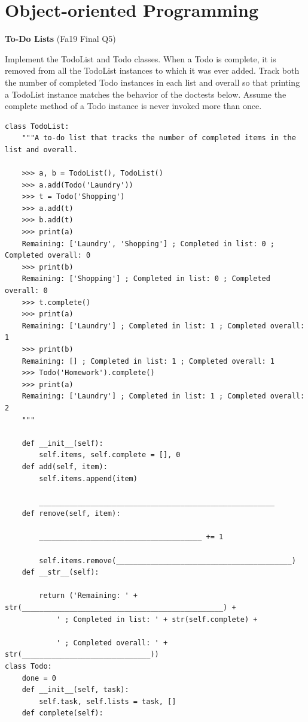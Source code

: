 \documentclass{exam}
\newlength{\currentparskip}
\newenvironment{blocksection}
{
    \setlength{\currentparskip}{\parskip}%
    \begin{minipage}{\linewidth}
    \setlength{\parskip}{\currentparskip}%
}
{
    \end{minipage}
}
\begin{document}
\newpage
\section{Object-oriented Programming}
\begin{questions}
\begin{blocksection}
\question \textbf{To-Do Lists} (Fa19 Final Q5)

    Implement the TodoList and Todo classes. When a Todo is complete, it is removed from all the TodoList instances to which it was ever added. Track both the number of completed Todo instances in each list and overall so that printing a TodoList instance matches the behavior of the doctests below. Assume the complete method of a Todo instance is never invoked more than once.
\end{blocksection}
\begin{blocksection}
\begin{lstlisting}
class TodoList:
    """A to-do list that tracks the number of completed items in the list and overall.

    >>> a, b = TodoList(), TodoList()
    >>> a.add(Todo('Laundry'))
    >>> t = Todo('Shopping')
    >>> a.add(t)
    >>> b.add(t)
    >>> print(a)
    Remaining: ['Laundry', 'Shopping'] ; Completed in list: 0 ; Completed overall: 0
    >>> print(b)
    Remaining: ['Shopping'] ; Completed in list: 0 ; Completed overall: 0
    >>> t.complete()
    >>> print(a)
    Remaining: ['Laundry'] ; Completed in list: 1 ; Completed overall: 1
    >>> print(b)
    Remaining: [] ; Completed in list: 1 ; Completed overall: 1
    >>> Todo('Homework').complete()
    >>> print(a)
    Remaining: ['Laundry'] ; Completed in list: 1 ; Completed overall: 2
    """
    
    def __init__(self):
        self.items, self.complete = [], 0
    def add(self, item):
        self.items.append(item)

        _______________________________________________________
    def remove(self, item):

        ______________________________________ += 1

        self.items.remove(_________________________________________)
    def __str__(self):

        return ('Remaining: ' + str(_______________________________________________) + 
            ' ; Completed in list: ' + str(self.complete) +

            ' ; Completed overall: ' + str(______________________________))
class Todo:
    done = 0
    def __init__(self, task):
        self.task, self.lists = task, []
    def complete(self):


\end{lstlisting}
\end{blocksection}
\end{questions}
\end{document}
